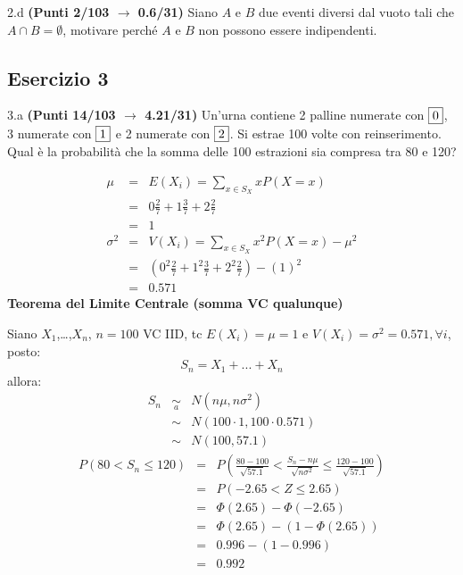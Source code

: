 \documentclass[
  11pt,
]{book}
\theoremstyle{mytheoremstyle}
\theoremstyle{mydefstyle}
\newenvironment{sol}
  {
  \begin{tcolorbox}[enhanced,breakable,arc=0.1mm,boxrule=1pt,colback=white,colframe=iblue,
  title=\bf \fontfamily{lmss}\selectfont \hspace{.5 cm} Soluzione,drop fuzzy shadow]

}{
\end{tcolorbox}
  }
\begin{document}
2.d \textbf{(Punti 2/103 \(\rightarrow\) 0.6/31)} Siano \(A\) e \(B\) due eventi diversi dal vuoto tali che \(A\cap B=\emptyset\), motivare perché \(A\) e \(B\) non possono essere indipendenti.

\subsection{Esercizio 3}\label{esercizio-3-23}

3.a \textbf{(Punti 14/103 \(\rightarrow\) 4.21/31)} Un'urna contiene 2 palline numerate con \(\fbox{0}\), 3 numerate con \(\fbox{1}\) e 2 numerate con \(\fbox{2}\). Si estrae 100 volte con reinserimento. Qual è la probabilità che la somma delle 100 estrazioni sia compresa tra 80 e 120?

\begin{sol}
\begin{eqnarray*} \mu &=& E(X_i) = \sum_{x\in S_X}x P(X=x)\\ 
 &=&  0  \frac { 2 }{ 7 }+ 1  \frac { 3 }{ 7 }+ 2  \frac { 2 }{ 7 } \\ 
            &=& 1 \\ 
 \sigma^2 &=& V(X_i) = \sum_{x\in S_X}x^2 P(X=x)-\mu^2\\ 
 &=&\left(  0  ^2\frac { 2 }{ 7 }+ 1  ^2\frac { 3 }{ 7 }+ 2  ^2\frac { 2 }{ 7 } \right)-( 1 )^2\\ 
            &=& 0.571 
\end{eqnarray*}
\textbf{Teorema del Limite Centrale (somma VC qualunque)}

Siano \(X_1\),\ldots,\(X_n\), \(n=100\) VC IID, tc \(E(X_i)=\mu=1\) e \(V(X_i)=\sigma^2=0.571,\forall i\), posto:
\[
      S_n = X_1 + ... + X_n
      \]
allora:\begin{eqnarray*}
  S_n & \mathop{\sim}\limits_{a}& N(n\mu,n\sigma^2) \\
     &\sim & N(100\cdot1,100\cdot0.571) \\
     &\sim & N(100,57.1) 
  \end{eqnarray*}\begin{eqnarray*}
   P( 80 < S_n \leq  120 ) &=& P\left( \frac { 80  -  100 }{\sqrt{ 57.1 }} < \frac { S_n  -  n\mu }{ \sqrt{n\sigma^2} } \leq \frac { 120  -  100 }{\sqrt{ 57.1 }}\right)  \\
              &=& P\left(  -2.65  < Z \leq  2.65 \right) \\
              &=& \Phi( 2.65 )-\Phi( -2.65 )\\
              &=&  \Phi( 2.65 )-(1-\Phi( 2.65 )) \\ &=&  0.996 -(1- 0.996 ) \\ 
              &=&  0.992 
   \end{eqnarray*}

\end{sol}
\end{document}
